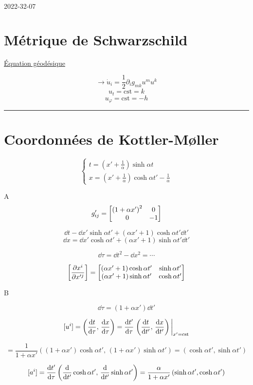 


2022-32-07

\section*{Métrique de Schwarzschild }

\underline{Équation géodésique} 

$$\to \dot u_i = \frac{1}{2} \partial_i g_{mk} u^{m}u^{k}$$ 
$$u_t = \text{cst} = k $$ 
$$u_{\varphi} = \text{cst} = -h $$ 

\hrule 

\section{ Coordonnées de Kottler-Møller}


$$\begin{cases}
	t = \left( x' + \frac{1}{\alpha}  \right) \sinh\alpha t\\
	x = \left( x' + \frac{1}{\alpha} \right) \cosh \alpha t' - \frac{1}{\alpha} 
\end{cases}$$ 

A $$g_{ij}' = \mqty[\left( 1 + \alpha x' \right)^2 &0 \\ 0 & -1 
] $$ 

$$\dd t - \dd x' \sinh \alpha t' + \left( \alpha x' + 1  \right) \cosh \alpha t' \dd t'$$ 
$$\dd x = \dd x' \cosh\alpha t'  + \left( \alpha x' +1 \right) \sinh \alpha t' \dd t'$$ 

$$\dd \tau =  \dd t^{2}- \dd x^{2} = \dotsb$$ 


$$\left[ \pdv{x^{i}}{x'^j}  \right] = \mqty[\left( \alpha x' +1 \right) \cosh\alpha t' & \sinh\alpha t' \\ \left( \alpha x' + 1  \right) \sinh\alpha t' & \cosh\alpha t'] $$ 



B

$$\dd \tau =  \left( 1 + \alpha x' \right) \dd t'$$ 

$$[u^{i}] = \left( \dv{t}{\tau} ,\, \dv{x}{\tau}  \right)  = \dv{t'}{\tau} \eval{\left( \dv{t}{t'} ,\, \dv{x}{t'}  \right) }_{x'=\text{cst} } $$ 

$$=  \frac{1}{1+\alpha{}x'} \left( \left( 1+\alpha x' \right) \cosh\alpha t',\, \left( 1+\alpha x' \right) \sinh\alpha t' \right) = \left( \cosh \alpha t', \sinh \alpha t' \right) $$ 

$$[a^{i}] = \dv{t'}{\tau} \left( \dv{	}{t'} \cosh \alpha t' ,\, \dv{{}}{t'} \sinh \alpha t' \right) = \frac{\alpha}{1+\alpha{}x'} \left( \sinh\alpha t', \cosh\alpha t' \right) $$ 




